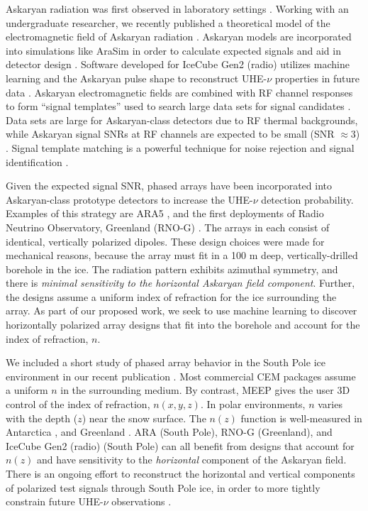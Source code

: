\documentclass[11pt]{amsart}
\begin{document}
Askaryan radiation was first observed in laboratory settings \cite{saltzberg,10.1103/PhysRevD.74.043002,ask_ice}.  Working with an undergraduate researcher, we recently published a theoretical model of the electromagnetic field of Askaryan radiation \cite{PhysRevD.105.123019}. Askaryan models are incorporated into simulations like AraSim in order to calculate expected signals and aid in detector design \cite{dookayka2011characterizing,testbed,10.1140/epjc/s10052-020-7612-8}.  Software developed for IceCube Gen2 (radio) utilizes machine learning and the Askaryan pulse shape to reconstruct UHE-$\nu$ properties in future data \cite{10.1140/epjc/s10052-019-6971-5,10.1088/1748-0221/15/09/p09039,IFT}.  Askaryan electromagnetic fields are combined with RF channel responses to form ``signal templates'' used to search large data sets for signal candidates \cite{10.1088/1475-7516/2020/03/053,10.1016/j.astropartphys.2014.09.002}.  Data sets are large for Askaryan-class detectors due to RF thermal backgrounds, while  Askaryan signal SNRs at RF channels are expected to be small (SNR $\approx 3$) \cite{10.1088/1475-7516/2020/03/053,rno}.  Signal template matching is a powerful technique for noise rejection and signal identification \cite{10.1016/j.astropartphys.2015.04.002,10.1016/j.astropartphys.2014.09.002,barwick2016radio,10.1088/1475-7516/2020/03/053}. 

Given the expected signal SNR, phased arrays have been incorporated into Askaryan-class prototype detectors \cite{Vieregg_2016,AVVA201746} to increase the UHE-$\nu$ detection probability.  Examples of this strategy are ARA5 \cite{PhysRevD.105.122006}, and the first deployments of Radio Neutrino Observatory, Greenland (RNO-G) \cite{rno}.  The arrays in each consist of identical, vertically polarized dipoles.  These design choices were made for mechanical reasons, because the array must fit in a 100 m deep, vertically-drilled borehole in the ice.  The radiation pattern exhibits azimuthal symmetry, and there is \textit{minimal sensitivity to the horizontal Askaryan field component}.  Further, the designs assume a uniform index of refraction for the ice surrounding the array.  As part of our proposed work, we seek to use machine learning to discover horizontally polarized array designs that fit into the borehole and account for the index of refraction, $n$.  

We included a short study of phased array behavior in the South Pole ice environment in our recent publication \cite{electronics10040415}.  Most commercial CEM packages assume a uniform $n$ in the surrounding medium.  By contrast, MEEP gives the user 3D control of the index of refraction, $n(x,y,z)$.  In polar environments, $n$ varies with the depth ($z$) near the snow surface.  The $n(z)$ function is well-measured in Antarctica \cite{horizPaper}, and Greenland \cite{deaconu_2018}.  ARA (South Pole), RNO-G (Greenland), and IceCube Gen2 (radio) (South Pole) can all benefit from designs that account for $n(z)$ and have sensitivity to the \textit{horizontal} component of the Askaryan field. There is an ongoing effort to reconstruct the horizontal and vertical components of polarized test signals through South Pole ice, in order to more tightly constrain future UHE-$\nu$ observations \cite{10.1088/1748-0221/15/09/p09039}. 
\end{document}
